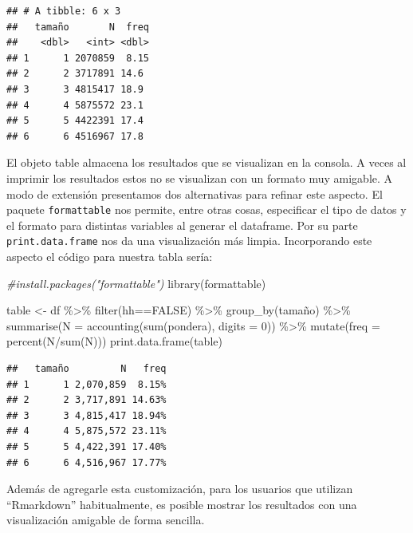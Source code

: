 \documentclass[
]{book}
\newenvironment{Shaded}{\begin{snugshade}}{\end{snugshade}}
\newcommand{\AttributeTok}[1]{\textcolor[rgb]{0.77,0.63,0.00}{#1}}
\newcommand{\CommentTok}[1]{\textcolor[rgb]{0.56,0.35,0.01}{\textit{#1}}}
\newcommand{\ConstantTok}[1]{\textcolor[rgb]{0.00,0.00,0.00}{#1}}
\newcommand{\DecValTok}[1]{\textcolor[rgb]{0.00,0.00,0.81}{#1}}
\newcommand{\FunctionTok}[1]{\textcolor[rgb]{0.00,0.00,0.00}{#1}}
\newcommand{\NormalTok}[1]{#1}
\newcommand{\OtherTok}[1]{\textcolor[rgb]{0.56,0.35,0.01}{#1}}
\newcommand{\SpecialCharTok}[1]{\textcolor[rgb]{0.00,0.00,0.00}{#1}}
\begin{document}
\begin{verbatim}
## # A tibble: 6 x 3
##   tamaño       N  freq
##    <dbl>   <int> <dbl>
## 1      1 2070859  8.15
## 2      2 3717891 14.6 
## 3      3 4815417 18.9 
## 4      4 5875572 23.1 
## 5      5 4422391 17.4 
## 6      6 4516967 17.8
\end{verbatim}

El objeto table almacena los resultados que se visualizan en la consola. A veces al imprimir los resultados estos no se visualizan con un formato muy amigable. A modo de extensión presentamos dos alternativas para refinar este aspecto. El paquete \texttt{formattable} nos permite, entre otras cosas, especificar el tipo de datos y el formato para distintas variables al generar el dataframe. Por su parte \texttt{print.data.frame} nos da una visualización más limpia. Incorporando este aspecto el código para nuestra tabla sería:

\begin{Shaded}
\begin{Highlighting}[]
\CommentTok{\#install.packages("formattable")}
\FunctionTok{library}\NormalTok{(formattable)}

\NormalTok{table }\OtherTok{\textless{}{-}}\NormalTok{ df }\SpecialCharTok{\%\textgreater{}\%} \FunctionTok{filter}\NormalTok{(hh}\SpecialCharTok{==}\ConstantTok{FALSE}\NormalTok{) }\SpecialCharTok{\%\textgreater{}\%} \FunctionTok{group\_by}\NormalTok{(tamaño) }\SpecialCharTok{\%\textgreater{}\%} \FunctionTok{summarise}\NormalTok{(}\AttributeTok{N =} \FunctionTok{accounting}\NormalTok{(}\FunctionTok{sum}\NormalTok{(pondera), }\AttributeTok{digits =} \DecValTok{0}\NormalTok{)) }\SpecialCharTok{\%\textgreater{}\%} 
                                                              \FunctionTok{mutate}\NormalTok{(}\AttributeTok{freq =} \FunctionTok{percent}\NormalTok{(N}\SpecialCharTok{/}\FunctionTok{sum}\NormalTok{(N)))}
\FunctionTok{print.data.frame}\NormalTok{(table)}
\end{Highlighting}
\end{Shaded}

\begin{verbatim}
##   tamaño         N   freq
## 1      1 2,070,859  8.15%
## 2      2 3,717,891 14.63%
## 3      3 4,815,417 18.94%
## 4      4 5,875,572 23.11%
## 5      5 4,422,391 17.40%
## 6      6 4,516,967 17.77%
\end{verbatim}

Además de agregarle esta customización, para los usuarios que utilizan ``Rmarkdown'' habitualmente, es posible mostrar los resultados con una visualización amigable de forma sencilla.
\end{document}
